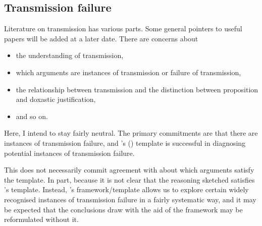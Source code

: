 \documentclass[10pt]{article}
\begin{document}
\subsection{Transmission failure}
\label{sec:transmission-failure}

\begin{note}[Transmission]
  Literature on transmission has various parts.
  Some general pointers to useful papers will be added at a later date.
  There are concerns about
  \begin{itemize}
  \item the understanding of transmission,
  \item which arguments are instances of transmission or failure of transmission,
  \item the relationship between transmission and the distinction between proposition and doxastic justification,
  \item and so on.
  \end{itemize}
  Here, I intend to stay fairly neutral.
  The primary commitments are that there are instances of transmission failure, and \citeauthor{Wright:2011wn}'s (\citeyear{Wright:2011wn}) template is successful in diagnosing potential instances of transmission failure.

  This does not necessarily commit agreement with \citeauthor{Wright:2011wn} about which arguments satisfy the template.
  In part, because it is not clear that the reasoning sketched satisfies \citeauthor{Wright:2011wn}'s template.
  Instead, \citeauthor{Wright:2011wn}'s framework/template allows us to explore certain widely recognised instances of transmission failure in a fairly systematic way, and it may be expected that the conclusions draw with the aid of the framework may be reformulated without it.
\end{note}
\end{document}
